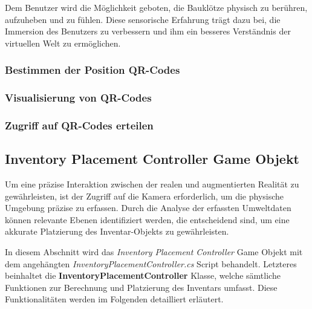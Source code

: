 Dem Benutzer wird die Möglichkeit geboten, die Bauklötze physisch zu berühren, aufzuheben und zu fühlen. Diese sensorische
Erfahrung trägt dazu bei, die Immersion des Benutzers zu verbessern und ihm ein besseres Verständnis der virtuellen Welt
zu ermöglichen.

\subsubsection{Bestimmen der Position QR-Codes}

\subsubsection{Visualisierung von QR-Codes}

\subsubsection{Zugriff auf QR-Codes erteilen}

\subsection{Inventory Placement Controller Game Objekt}
Um eine präzise Interaktion zwischen der realen und augmentierten Realität zu gewährleisten, ist der Zugriff auf die Kamera
erforderlich, um die physische Umgebung präzise zu erfassen. Durch die Analyse der erfassten Umweltdaten können relevante
Ebenen identifiziert werden, die entscheidend sind, um eine akkurate Platzierung des Inventar-Objekts zu gewährleisten.

In diesem Abschnitt wird das \textit{Inventory Placement Controller} Game Objekt mit dem angehängten
\textit{InventoryPlacementController.cs} Script behandelt. Letzteres beinhaltet die \textbf{InventoryPlacementController}
Klasse, welche sämtliche Funktionen zur Berechnung und Platzierung des Inventars umfasst. Diese Funktionalitäten werden
im Folgenden detailliert erläutert.

